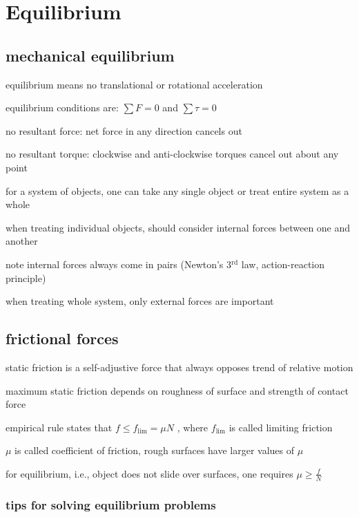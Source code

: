 \section{Equilibrium}

\subsection{mechanical equilibrium}

equilibrium means no translational or rotational acceleration

equilibrium conditions are: $\boxed{\sum F = 0}$ and $\boxed{\sum \tau = 0}$

no resultant force: net force in any direction cancels out

no resultant torque: clockwise and anti-clockwise torques cancel out about any point

for a system of objects, one can take any single object or treat entire system as a whole

when treating individual objects, should consider internal forces between one and another

note internal forces always come in pairs (Newton’s 3$^\text{rd}$ law, action-reaction principle)

when treating whole system, only external forces are important

\subsection{frictional forces}

static friction is a self-adjustive force that always opposes trend of relative motion

maximum static friction depends on roughness of surface and strength of contact force

empirical rule states that $\boxed{f \leq f_\text{lim} = \mu N}$ , where $f_\text{lim}$ is called limiting friction

$\mu$ is called coefficient of friction, rough surfaces have larger values of $\mu$

for equilibrium, i.e., object does not slide over surfaces, one requires $\boxed{\mu \geq \frac{f}{N}}$

\subsubsection*{tips for solving equilibrium problems}

